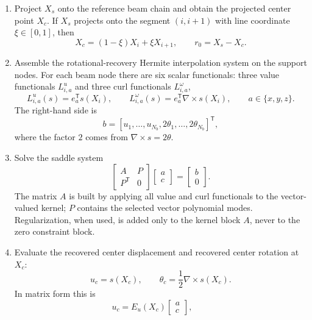 \documentclass[11pt,a4paper]{article}
\newcommand{\T}{\mathsf{T}}
\newcommand{\curl}{\nabla\times}
\begin{document}
\begin{enumerate}
\item Project \(X_s\) onto the reference beam chain and obtain the projected
      center point \(X_c\).  If \(X_s\) projects onto the segment
      \((i,i+1)\) with line coordinate \(\xi\in[0,1]\), then
      \[
        X_c=(1-\xi)X_i+\xi X_{i+1},
        \qquad
        r_0=X_s-X_c .
      \]
\item Assemble the rotational-recovery Hermite interpolation system on the
      support nodes.  For each beam node there are six scalar functionals:
      three value functionals \(L_{i,a}^{u}\) and three curl functionals
      \(L_{i,a}^{\omega}\),
      \[
        L_{i,a}^{u}(s)=e_a^\T s(X_i),
        \qquad
        L_{i,a}^{\omega}(s)=e_a^\T\curl s(X_i),
        \qquad a\in\{x,y,z\}.
      \]
      The right-hand side is
      \[
        b =
        \left[
          u_1,\ldots,u_{N_b},
          2\theta_1,\ldots,2\theta_{N_b}
        \right]^\T ,
      \]
      where the factor \(2\) comes from
      \(\curl s=2\theta\).
\item Solve the saddle system
      \begin{equation}
      \begin{bmatrix}
        A & P\\
        P^\T & 0
      \end{bmatrix}
      \begin{bmatrix}
        a\\ c
      \end{bmatrix}
      =
      \begin{bmatrix}
        b\\ 0
      \end{bmatrix}.
      \label{eq:finite_hybrid_saddle_system}
      \end{equation}
      The matrix \(A\) is built by applying all value and curl functionals to
      the vector-valued kernel; \(P\) contains the selected vector polynomial
      modes.  Regularization, when used, is added only to the kernel block
      \(A\), never to the zero constraint block.
\item Evaluate the recovered center displacement and recovered center
      rotation at \(X_c\):
      \[
        u_c=s(X_c),
        \qquad
        \theta_c=\frac12\curl s(X_c).
      \]
      In matrix form this is
      \[
        u_c=E_u(X_c)
        \begin{bmatrix}a\\c\end{bmatrix},
        \qquad
\]
\end{enumerate}
\end{document}
